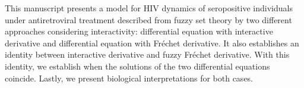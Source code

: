
This manuscript presents a model for HIV dynamics of seropositive individuals under antiretroviral treatment described from fuzzy set theory by two different approaches considering interactivity: differential equation with interactive derivative and differential equation with Fr\'echet derivative. It also establishes an identity between interactive derivative and fuzzy Fr\'echet derivative. With this identity, we establish when the solutions of the two differential equations coincide. Lastly, we present biological interpretations for both cases.


